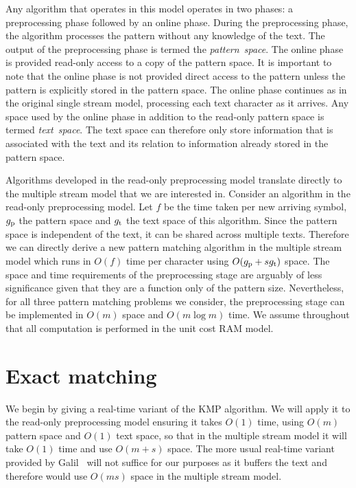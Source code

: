 \documentclass[envcountsame]{llncs}
\begin{document}
Any algorithm that operates in this model operates in two phases: a
preprocessing phase followed by an online phase. During the
preprocessing phase, the algorithm processes the pattern without any
knowledge of the text. The output of the preprocessing phase is termed
the \emph{pattern~space}.   The online phase
is provided read-only access to a copy of the pattern space. It is
important to note that the online phase is not provided direct access
to the pattern unless the pattern is explicitly stored in the pattern
space. The online phase continues as in the original single stream model, processing each text character as it arrives. Any space used by the online phase in addition to the read-only pattern space is termed \emph{text~space}. The text space can therefore only store information that is associated with the text and its relation to information already stored in the pattern space.

Algorithms developed in the read-only preprocessing model translate directly to the
multiple stream model that we are interested in. Consider an algorithm
in the read-only preprocessing model. Let $f$ be the
time taken per new arriving symbol, $g_\textup{p}$ the pattern space
and $g_\textup{t}$ the text space of this algorithm. Since the pattern
space is independent of the text, it can be shared across multiple
texts. Therefore we can directly derive a new pattern matching
algorithm in the multiple stream model which runs in $O(f)$ time per
character using $O(g_\textup{p}+sg_\textup{t})$ space.  The space and
time requirements of the preprocessing stage are arguably of less
significance given that they are a function only of the pattern size.
Nevertheless, for all three pattern matching problems we consider,
the preprocessing stage can be implemented in $O(m)$ space and $O(m\log{m})$ time.
We assume throughout that all computation is performed in the unit cost RAM model.




\section{Exact matching}\label{sec:exact}

We begin by giving a real-time variant of the KMP algorithm. We will apply it to the read-only preprocessing model ensuring it takes
$O(1)$ time, using $O(m)$ pattern space and $O(1)$ text space,
so that in the multiple stream model it will take $O(1)$ time and use $O(m+s)$ space.
The more usual real-time variant provided by Galil~\cite{Galil:1981} will not suffice for our purposes as it buffers the text and therefore would use $O(ms)$ space in the multiple stream model.
\end{document}
